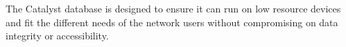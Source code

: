 The Catalyst database is designed to ensure it can run on low resource devices and fit the different needs of the network users without compromising on data integrity or accessibility. 